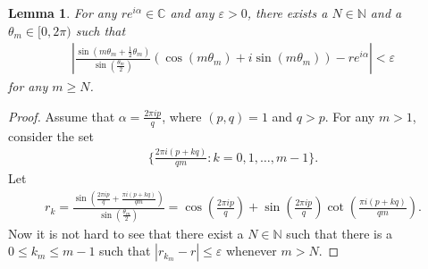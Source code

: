 \documentclass[a4paper,10pt]{amsart}
\newtheorem{lemma}{Lemma}[section]
\newcommand{\C}{\mathbb C} %
\newcommand{\N}{\mathbb N} %
\begin{document}
\begin{lemma}
    For any $re^{i\alpha} \in \C$ and any $\varepsilon > 0$, 
   there exists a $N \in \N$ and a $\theta_{m} \in [0, 2\pi)$
   such that
   \begin{align*}
      |\frac{\sin (m\theta_m + \frac{1}{2}\theta_m)}
       {\sin (\frac{\theta_m}{2})} \left (
   \cos (m\theta_m) + i\sin (m\theta_m) \right) - re^{i\alpha}| 
   < \varepsilon
   \end{align*}
   for any $m \geq N$.
\end{lemma}

\begin{proof}
    Assume that $\alpha = \frac{2\pi i p}{q}$, where $(p, q) = 1$ and 
    $q > p$. For any $m > 1$, consider the set
    \begin{align*}
        \{\frac{2\pi i (p + kq)}{qm} : k = 0, 1, \ldots, m-1 \}. 
    \end{align*}
    Let  
    \begin{align*}
        r_{k} = \frac{\sin (\frac{2\pi i p}{q}+ 
        \frac{\pi i (p + kq)}{qm})}
        {\sin (\frac{\theta_m}{2})}
     = \cos (\frac{2\pi i p}{q}) + \sin (\frac{2\pi i p}{q})
     \cot (\frac{\pi i (p + kq)}{qm}).
    \end{align*}
    Now it is not hard to see that there exist a $N \in \N$ such that
    there is a $0 \leq k_m \leq m-1$ such that 
    $|r_{k_m} - r| \leq \varepsilon$ whenever $m > N$. 
\end{proof}





%

%

\end{document}
